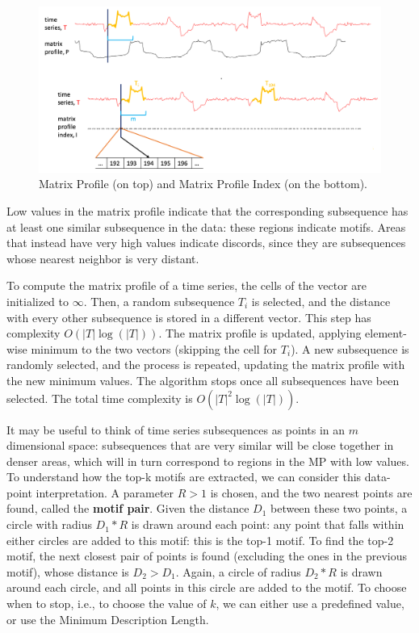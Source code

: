 \begin{figure}[ht]
    \centering
    \includegraphics[width=0.9\linewidth]{img/mp_mpi.png}
    \caption{Matrix Profile (on top) and Matrix Profile Index (on the bottom).}
    \label{fig:mp-mpi}
\end{figure}

Low values in the matrix profile indicate that the corresponding subsequence has at least one similar subsequence in the data: these regions indicate motifs. Areas that instead have very high values indicate discords, since they are subsequences whose nearest neighbor is very distant.

To compute the matrix profile of a time series, the cells of the vector are initialized to $\infty$. Then, a random subsequence $T_i$ is selected, and the distance with every other subsequence is stored in a different vector. This step has complexity $O(|T| \log(|T|))$. The matrix profile is updated, applying element-wise minimum to the two vectors (skipping the cell for $T_i$). A new subsequence is randomly selected, and the process is repeated, updating the matrix profile with the new minimum values. The algorithm stops once all subsequences have been selected. The total time complexity is $O(|T|^2 \log(|T|))$.

It may be useful to think of time series subsequences as points in an $m$ dimensional space: subsequences that are very similar will be close together in denser areas, which will in turn correspond to regions in the MP with low values. To understand how the top-k motifs are extracted, we can consider this data-point interpretation. A parameter $R > 1$ is chosen, and the two nearest points are found, called the \textbf{motif pair}. Given the distance $D_1$ between these two points, a circle with radius $D_1 * R$ is drawn around each point: any point that falls within either circles are added to this motif: this is the top-1 motif. To find the top-2 motif, the next closest pair of points is found (excluding the ones in the previous motif), whose distance is $D_2 > D_1$. Again, a circle of radius $D_2 * R$ is drawn around each circle, and all points in this circle are added to the motif. To choose when to stop, i.e., to choose the value of $k$, we can either use a predefined value, or use the Minimum Description Length.

